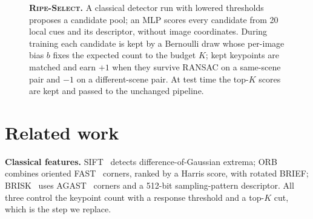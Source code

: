 \documentclass[10pt,twocolumn,letterpaper]{article}
\newcommand{\ours}{\textup{\textsc{Ripe-Select}}\xspace}
\newcommand{\q}[1]{\noindent\textbf{#1}\hspace{0.4em}}
\begin{document}
\begin{figure}[t]
\caption{\textbf{\ours.} A classical detector run with lowered thresholds proposes a candidate pool; an MLP
scores every candidate from 20 local cues and its descriptor, without image coordinates. During training each
candidate is kept by a Bernoulli draw whose per-image bias $b$ fixes the expected count to the budget $K$; kept
keypoints are matched and earn $+1$ when they survive RANSAC on a same-scene pair and $-1$ on a different-scene
pair. At test time the top-$K$ scores are kept and passed to the unchanged pipeline.}
\label{fig:method}
\end{figure}

\section{Related work}
\label{sec:related}

\q{Classical features.} SIFT~\cite{lowe2004sift} detects difference-of-Gaussian extrema;
ORB~\cite{rublee2011orb} combines oriented FAST~\cite{rosten2006fast} corners, ranked by a Harris score, with
rotated BRIEF; BRISK~\cite{leutenegger2011brisk} uses AGAST~\cite{mair2010agast} corners and a 512-bit
sampling-pattern descriptor. All three control the keypoint count with a response threshold and a top-$K$ cut,
which is the step we replace.
\end{document}
